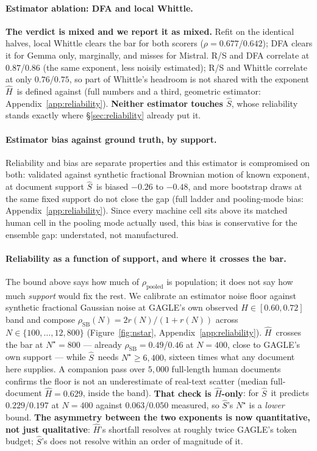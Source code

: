 \documentclass{article}
\newcommand{\Sest}{\ensuremath{\widehat{S}}}
\newcommand{\Hest}{\ensuremath{\widehat{H}}}
\newcommand{\Htrue}{\ensuremath{H}}
\begin{document}
\paragraph{Estimator ablation: DFA and local Whittle.} \textbf{The verdict is
mixed and we report it as mixed.} Refit on the identical halves, local
Whittle clears the bar for both scorers ($\rho=0.677$/$0.642$); DFA clears it
for Gemma only, marginally, and misses for Mistral. R/S and DFA correlate at
$0.87$/$0.86$ (the same exponent, less noisily estimated); R/S and Whittle
correlate at only $0.76$/$0.75$, so part of Whittle's headroom is not shared
with the exponent \Hest\ is defined against (full numbers and a third,
geometric estimator: Appendix~\ref{app:reliability}). \textbf{Neither estimator touches
\Sest}, whose reliability stands exactly where \S\ref{sec:reliability}
already put it.

\paragraph{Estimator bias against ground truth, by support.} Reliability and
bias are separate properties and this estimator is compromised on both:
validated against synthetic fractional Brownian motion of known exponent, at
document support \Sest\ is biased $-0.26$ to $-0.48$, and more bootstrap
draws at the same fixed support do not close the gap (full ladder and
pooling-mode bias: Appendix~\ref{app:reliability}). Since every machine cell
sits above its matched human cell in the pooling mode actually used, this
bias is conservative for the ensemble gap: understated, not manufactured.

\paragraph{Reliability as a function of support, and where it crosses the bar.}
The bound above says how much of $\rho_{\text{pooled}}$ is population; it does
not say how much \emph{support} would fix the rest. We calibrate an estimator
noise floor against synthetic fractional Gaussian noise at GAGLE's own observed
$\Htrue\in[0.60,0.72]$ band and compose $\rho_{\text{SB}}(N)=2r(N)/(1+r(N))$
across $N\in\{100,\ldots,12{,}800\}$ (Figure~\ref{fig:nstar},
Appendix~\ref{app:reliability}). \Hest\ crosses the bar at $N^{\star}=800$ ---
already $\rho_{\text{SB}}=0.49$/$0.46$ at $N=400$, close to GAGLE's own support
--- while \Sest\ needs $N^{\star}\!\ge\!6{,}400$, sixteen times what any
document here supplies. A companion pass over $5{,}000$ full-length human
documents confirms the floor is not an underestimate of real-text scatter
(median full-document $\Hest=0.629$, inside the band). \textbf{That check is
\Hest-only}: for \Sest\ it predicts $0.229$/$0.197$ at $N=400$ against
$0.063$/$0.050$ measured, so \Sest's $N^{\star}$ is a \emph{lower} bound.
\textbf{The asymmetry between the two
exponents is now quantitative, not just qualitative}: \Hest's shortfall
resolves at roughly twice GAGLE's token budget; \Sest's does not resolve
within an order of magnitude of it.
\end{document}
